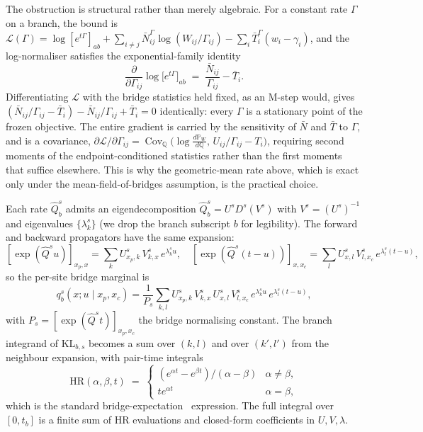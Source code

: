 \begin{remark}
\label{rem:mstep-degenerate}
The obstruction is structural rather than merely algebraic. For a constant rate
$\Gamma$ on a branch, the bound is
$\mathcal{L}(\Gamma) = \log[e^{t\Gamma}]_{ab}
+ \sum_{i \neq j} \bar N^\Gamma_{ij} \log(W_{ij}/\Gamma_{ij})
- \sum_i \bar T^\Gamma_i (w_i - \gamma_i)$,
and the log-normaliser satisfies the exponential-family identity
\[
    \frac{\partial}{\partial \Gamma_{ij}} \log\bigl[e^{t\Gamma}\bigr]_{ab}
    \;=\; \frac{\bar N_{ij}}{\Gamma_{ij}} - \bar T_i .
\]
Differentiating $\mathcal{L}$ with the bridge statistics held fixed, as an
M-step would, gives
$(\bar N_{ij}/\Gamma_{ij} - \bar T_i) - \bar N_{ij}/\Gamma_{ij} + \bar T_i = 0$
identically: every $\Gamma$ is a stationary point of the frozen objective. The
entire gradient is carried by the sensitivity of $\bar N$ and $\bar T$ to
$\Gamma$, and is a covariance,
$\partial \mathcal{L} / \partial \Gamma_{ij}
= \operatorname{Cov}_{\mathbb{Q}}\bigl(\log \tfrac{d\mathbb{P}_W}{d\mathbb{Q}},\,
U_{ij}/\Gamma_{ij} - T_i\bigr)$,
requiring second moments of the endpoint-conditioned statistics rather than the
first moments that suffice elsewhere. This is why the geometric-mean rate above,
which is exact only under the mean-field-of-bridges assumption, is the practical
choice.
\end{remark}

\begin{remark}
\label{rem:bridge-expectations}
Each rate $\hat Q^s_b$ admits an eigendecomposition
$\hat Q^s_b = U^s D^s (V^s)$ with $V^s = (U^s)^{-1}$ and eigenvalues
$\{\lambda^s_k\}$ (we drop the branch subscript $b$ for legibility).
The forward and backward propagators have the same expansion:
\[
    [\exp(\hat Q^s u)]_{x_p, x} = \sum_k U^s_{x_p, k}\, V^s_{k, x}\, e^{\lambda^s_k u},
    \quad
    [\exp(\hat Q^s (t-u))]_{x, x_c} = \sum_l U^s_{x, l}\, V^s_{l, x_c}\, e^{\lambda^s_l (t-u)},
\]
so the per-site bridge marginal is
\[
    q^s_b(x; u \mid x_p, x_c) =
    \frac{1}{P_s} \sum_{k, l} U^s_{x_p, k}\, V^s_{k, x}\,
    U^s_{x, l}\, V^s_{l, x_c}\, e^{\lambda^s_k u}\, e^{\lambda^s_l (t-u)},
\]
with $P_s = [\exp(\hat Q^s t)]_{x_p, x_c}$ the bridge normalising
constant. The branch integrand of $\mathrm{KL}_{b, s}$ becomes a sum
over $(k, l)$ and over $(k', l')$ from the neighbour expansion, with
pair-time integrals
\[
    \mathrm{HR}(\alpha, \beta, t) \;=\;
    \begin{cases}
    (e^{\alpha t} - e^{\beta t}) / (\alpha - \beta) & \alpha \neq \beta, \\
    t e^{\alpha t} & \alpha = \beta,
    \end{cases}
\]
which is the standard bridge-expectation~\citep{HolmesRubin2002}
expression. The full integral over $[0, t_b]$ is a finite sum of
$\mathrm{HR}$ evaluations and closed-form coefficients in
$U, V, \lambda$.
\end{remark}

